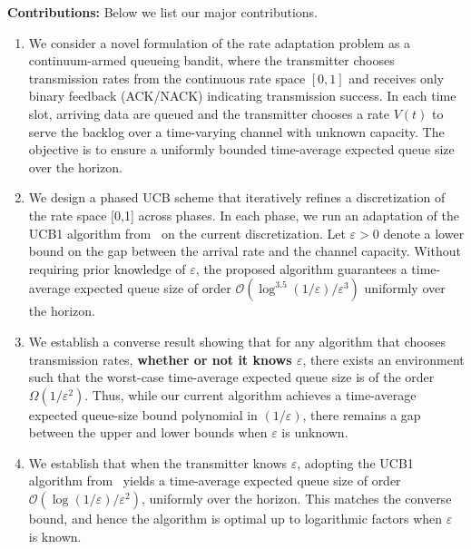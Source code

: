 \documentclass[12pt,draftcls, onecolumn]{IEEEtran}
\begin{document}
\noindent
\textbf{Contributions:} Below we list our major contributions. 
\begin{enumerate}
    \item We consider a novel formulation of the rate adaptation problem as a continuum-armed queueing bandit, where the transmitter chooses transmission rates from the continuous rate space $[0,1]$ and receives only binary feedback (ACK/NACK) indicating transmission success. In each time slot, arriving data are queued and the transmitter chooses a rate $V(t)$ to serve the backlog over a time-varying channel with unknown capacity. The objective is to ensure a uniformly bounded time-average expected queue size over the horizon.
    \item We design a phased UCB scheme that iteratively refines a discretization of the rate space [0,1] across phases. In each phase, we run an adaptation of the UCB1 algorithm from~\cite{Auer2002FinitetimeAO} on the current discretization. Let $\varepsilon > 0$ denote a lower bound on the gap between the arrival rate and the channel capacity. Without requiring prior knowledge of $\varepsilon$, the proposed algorithm guarantees a time-average expected queue size of order $\mathcal{O}(\log^{3.5}(1/\varepsilon)/\varepsilon^3)$ uniformly over the horizon.
    \item We establish a converse result showing that for any algorithm that chooses transmission rates, \textbf{whether or not it knows $\varepsilon$}, there exists an environment such that the worst-case time-average expected queue size is of the order $\Omega(1/\varepsilon^2)$. Thus, while our current algorithm achieves a time-average expected queue-size bound polynomial in $(1/\varepsilon)$, there remains a gap between the upper and lower bounds when $\varepsilon$ is unknown.
    \item  We establish that when the transmitter knows $\varepsilon$, adopting the UCB1 algorithm from~\cite{Auer2002FinitetimeAO} yields a time-average expected queue size of order $\mathcal{O}(\log(1/\varepsilon)/\varepsilon^2)$, uniformly over the horizon. This matches the converse bound, and hence the algorithm is optimal up to logarithmic factors when $\varepsilon$ is known. 
\end{enumerate}
\end{document}
